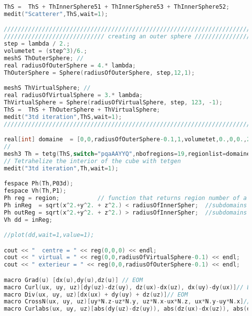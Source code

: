 \begin{lstlisting}[language=C]
ThS =  ThS + ThInnerSphere51 + ThInnerSphere53 + ThInnerSphere52;
medit("Scatterer",ThS,wait=1);

//////////////////////////////////////////////////////////////////////////////////////////////
///////////////////////////// creating an outer sphere ///////////////////////////////////////
step = lambda / 2.;
volumetet = (step^3)/6.;  
meshS ThOuterSphere; // 
real radiusOfOuterSphere = 4.* lambda;
ThOuterSphere = Sphere(radiusOfOuterSphere, step,12,1);

meshS ThVirtualSphere; // 
real radiusOfVirtualSphere = 3.* lambda;
ThVirtualSphere = Sphere(radiusOfVirtualSphere, step, 123, -1);
ThS =  ThS + ThOuterSphere + ThVirtualSphere;
medit("3td iteration",ThS,wait=1);
/////////////////////////////////////////////////////////////////////////////

real[int] domaine  = [0,0,radiusOfOuterSphere-0.1,1,volumetet,0.,0,0.,2,volumetetIn,0.,0,radiusOfVirtualSphere-0.1,3,volumetet,ddx,0,0.,4,volumetetIn,-ddx,0,0,5,volumetetIn,0,ddx,0,6,volumetetIn,0,-ddx,0,7,volumetetIn, ddx,ddy,0,8,volumetetIn,ddx,-ddy,0.,9,volumetetIn,ddx+ddy,0,0.,10,volumetetIn,-ddx,ddy,0,11,volumetetIn,-ddx,-ddy,0,12,volumetetIn,-ddx-ddy,0,0,13,volumetetIn, 0,ddx+ddy,0,14,volumetetIn, -ddy,ddx,0,15,volumetetIn, ddy,ddx,0,16,volumetetIn, 0, -ddx-ddy,0,17,volumetetIn, ddy,-ddx,0,18,volumetetIn, -ddy, -ddx,0,19,volumetetIn];
//
mesh3 Th = tetg(ThS,switch="pqaAAYYQ",nbofregions=19,regionlist=domaine);
// Tetrahelize the interior of the cube with tetgen
medit("3td iteration",Th,wait=1);

fespace Ph(Th,P03d);
fespace Vh(Th,P1);
Ph reg = region;           // function that returns region number of a point XY
Ph inReg  = sqrt(x^2.+y^2. + z^2.) < radiusOfInnerSpher;  //subdomains for inside the sratterer
Ph outReg = sqrt(x^2.+y^2. + z^2.) > radiusOfInnerSpher;  //subdomains for outside the scatterer
Vh dd = inReg;

//plot(dd,wait=1,value=1);

cout << "  centre = " << reg(0,0,0) << endl;
cout << " virtual = " << reg(0,0,radiusOfVirtualSphere-0.1) << endl;
cout << " exterieur = " << reg(0,0,radiusOfOuterSphere-0.1) << endl;

macro Grad(u) [dx(u),dy(u),dz(u)] // EOM
macro Curl(ux, uy, uz)[dy(uz)-dz(uy), dz(ux)-dx(uz), dx(uy)-dy(ux)]// EOM
macro Div(ux, uy, uz)[dx(ux) + dy(uy) + dz(uz)]// EOM
macro CrossN(ux, uy, uz)[uy*N.z-uz*N.y, uz*N.x-ux*N.z, ux*N.y-uy*N.x]// EOM
macro Curlabs(ux, uy, uz)[abs(dy(uz)-dz(uy)), abs(dz(ux)-dx(uz)), abs(dx(uy)-dy(ux))]// EOM


\end{lstlisting}
